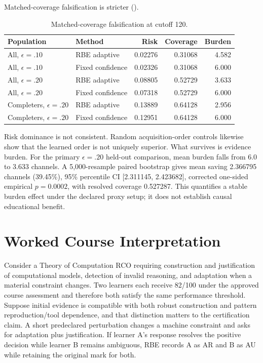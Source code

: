 \documentclass[11pt]{article}
\begin{document}
Matched-coverage falsification is stricter ().
\begin{table}[t]\centering\caption{Matched-coverage falsification at cutoff 120.}\label{tab:false}
\small\begin{tabular}{llrrr}\toprule Population&Method&Risk&Coverage&Burden\\\midrule
All, $\epsilon=.10$&RBE adaptive&0.02276&0.31068&4.582\\All, $\epsilon=.10$&Fixed confidence&0.02326&0.31068&6.000\\All, $\epsilon=.20$&RBE adaptive&0.08805&0.52729&3.633\\All, $\epsilon=.20$&Fixed confidence&0.07318&0.52729&6.000\\Completers, $\epsilon=.20$&RBE adaptive&0.13889&0.64128&2.956\\Completers, $\epsilon=.20$&Fixed confidence&0.12951&0.64128&6.000\\\bottomrule\end{tabular}\end{table}
Risk dominance is not consistent. Random acquisition-order controls likewise show that the learned order is not uniquely superior. What survives is evidence burden. For the primary $\epsilon=.20$ held-out comparison, mean burden falls from 6.0 to 3.633 channels. A 5,000-resample paired bootstrap gives mean saving 2.366795 channels (39.45\%), 95\% percentile CI [2.311145, 2.423682], corrected one-sided empirical $p=0.0002$, with resolved coverage 0.527287. This quantifies a stable burden effect under the declared proxy setup; it does not establish causal educational benefit.

\section{Worked Course Interpretation}
Consider a Theory of Computation RCO requiring construction and justification of computational models, detection of invalid reasoning, and adaptation when a material constraint changes. Two learners each receive 82/100 under the approved course assessment and therefore both satisfy the same performance threshold. Suppose initial evidence is compatible with both robust construction and pattern reproduction/tool dependence, and that distinction matters to the certification claim. A short predeclared perturbation changes a machine constraint and asks for adaptation plus justification. If learner A's response resolves the positive decision while learner B remains ambiguous, RBE records A as AR and B as AU while retaining the original mark for both.
\end{document}
